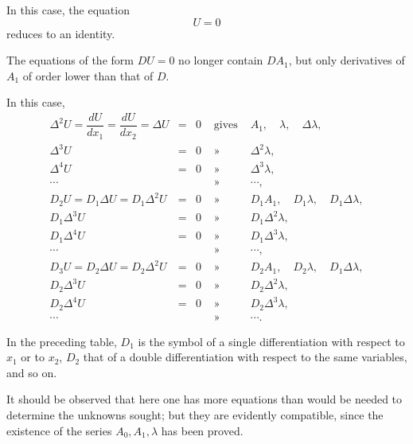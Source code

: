 \documentclass[11pt]{article}
\begin{document}
In this case, the equation
\[
U=0
\]
reduces to an identity.

The equations of the form $DU=0$ no longer contain $DA_1$, but only derivatives of $A_1$ of order lower than that of $D$.

In this case,
\[
\begin{array}{rclcl}
\Delta^2U=\dfrac{dU}{dx_1}=\dfrac{dU}{dx_2}=\Delta U&=&0&\text{ gives }&A_1,\quad \lambda,\quad \Delta\lambda,\\
\Delta^3U&=&0&\text{ » }&\Delta^2\lambda,\\
\Delta^4U&=&0&\text{ » }&\Delta^3\lambda,\\
\cdots&&&\text{ » }&\cdots,\\
D_2U=D_1\Delta U=D_1\Delta^2U&=&0&\text{ » }&D_1A_1,\quad D_1\lambda,\quad D_1\Delta\lambda,\\
D_1\Delta^3U&=&0&\text{ » }&D_1\Delta^2\lambda,\\
D_1\Delta^4U&=&0&\text{ » }&D_1\Delta^3\lambda,\\
\cdots&&&\text{ » }&\cdots,\\
D_3U=D_2\Delta U=D_2\Delta^2U&=&0&\text{ » }&D_2A_1,\quad D_2\lambda,\quad D_1\Delta\lambda,\\
D_2\Delta^3U&=&0&\text{ » }&D_2\Delta^2\lambda,\\
D_2\Delta^4U&=&0&\text{ » }&D_2\Delta^3\lambda,\\
\cdots&&&\text{ » }&\cdots.
\end{array}
\]

In the preceding table, $D_1$ is the symbol of a single differentiation with respect to $x_1$ or to $x_2$, $D_2$ that of a double differentiation with respect to the same variables, and so on.

It should be observed that here one has more equations than would be needed to determine the unknowns sought; but they are evidently compatible, since the existence of the series $A_0,A_1,\lambda$ has been proved.
\end{document}

